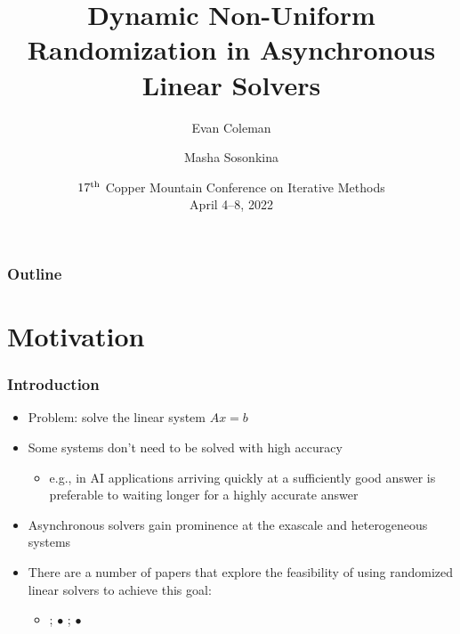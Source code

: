 \documentclass{beamer}
\title[Randomized Asynchronous Linear Solvers]{Dynamic Non-Uniform Randomization in Asynchronous Linear Solvers}
\author[Coleman \& Sosonkina]{Evan Coleman\inst{1} \and Masha Sosonkina\inst{2}}
\institute %
{
  \inst{1}%
  United States Department of Defense
   \and
  \inst{2}%
  Old Dominion University\\
}
\date{$17^{\rm th}$ Copper Mountain Conference on
Iterative Methods\\ April 4--8, 2022}
\begin{document}
%
\begin{frame}
	\titlepage
\end{frame}


\begin{frame}
	\frametitle{Outline}
	\tableofcontents
\end{frame}

\section{Motivation}

\begin{frame}
	\frametitle{Introduction}
	\begin{itemize}
		\item Problem: solve the linear system $Ax = b$
		\item Some systems don't need to be solved with high accuracy
		    \begin{itemize}
		        \item e.g., in AI applications arriving quickly at a sufficiently good answer is preferable to waiting longer for a highly accurate answer
		    \end{itemize}
		\item Asynchronous solvers gain prominence at the exascale and heterogeneous systems
	    \item There are a number of papers that explore the feasibility of using randomized linear solvers to achieve this goal:
	        \begin{itemize}
	            \item \textcite{leventhal2010randomized}; 
	            $\bullet$ \textcite{griebel2012greedy};
	            $\bullet$ \textcite{avron2015revisiting}
	        \end{itemize}
	\end{itemize}	
\end{frame}

\end{document}
